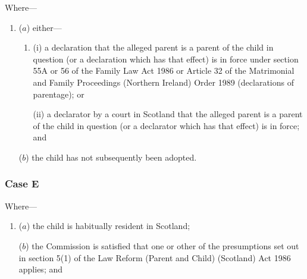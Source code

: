 \documentclass[12pt,a4paper]{article}
\begin{document}
\begin{enumerate}
    Where—
\begin{enumerate}\item[]
    ($a$) 
    either—
\begin{enumerate}\item[]
    (i) 
    a declaration that the alleged parent is a parent of the child in question (or a declaration which has that effect) is in force under section 
55A or  %
56 of the Family Law Act 1986 
or Article 32 of the Matrimonial and Family Proceedings (Northern Ireland) Order 1989  %
(declarations of parentage); or

    (ii) 
    a declarator by a court in Scotland that the alleged parent is a parent of the child in question (or a declarator which has that effect) is in force; and
\end{enumerate}

    ($b$) 
    the child has not subsequently been adopted.
\end{enumerate}

%
%

    \subsubsection*{Case E}

    Where—
\begin{enumerate}\item[]
    ($a$) 
    the child is habitually resident in Scotland;

    ($b$) 
the 
Commission  %
is satisfied that one or other of the presumptions set out in section 5(1)  of the Law Reform (Parent and Child) (Scotland) Act 1986 applies; and


\end{enumerate}
\end{enumerate}
\end{document}
